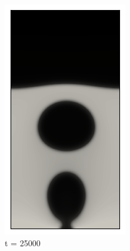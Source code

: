 \begin{figure}[h!]
	\medskip
	\begin{subfigure}{0.25\textwidth}
		\includegraphics[width=\linewidth]{figs/cap4/bubble_25}
		\caption{t = 25000}
		\label{fig:4}
	\end{subfigure}\hfil %
	\begin{subfigure}{0.25\textwidth}

\end{subfigure}
\end{figure}
